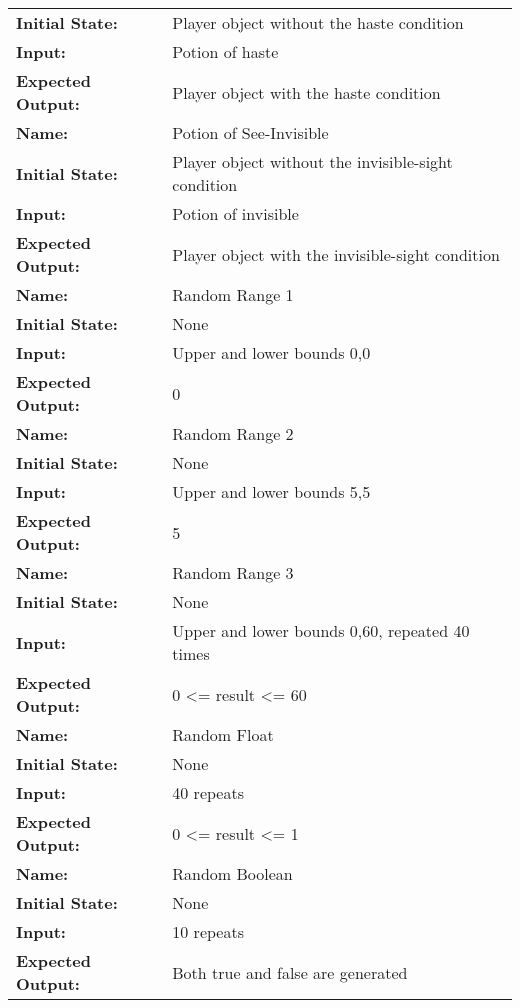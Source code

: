 \documentclass[12pt, titlepage]{article}
\begin{document}
\begin{center}
\begin{longtable}{ l | p{10cm} }
				\textbf{Initial State:} & Player object without the haste condition\\
				\textbf{Input:} & Potion of haste\\
				\textbf{Expected Output:} & Player object with the haste condition\\[0.6em]
				\hline
				\rule{0pt}{1.5em}\textbf{Name:} & Potion of See-Invisible\\
				\textbf{Initial State:} & Player object without the invisible-sight condition\\
				\textbf{Input:} & Potion of invisible\\
				\textbf{Expected Output:} & Player object with the invisible-sight condition\\[0.6em]
				\hline
				\rule{0pt}{1.5em}\textbf{Name:} & Random Range 1\\
				\textbf{Initial State:} & None\\
				\textbf{Input:} & Upper and lower bounds 0,0\\
				\textbf{Expected Output:} & 0\\[0.6em]
				\hline
				\rule{0pt}{1.5em}\textbf{Name:} & Random Range 2\\
				\textbf{Initial State:} & None\\
				\textbf{Input:} & Upper and lower bounds 5,5\\
				\textbf{Expected Output:} & 5\\[0.6em]
				\hline
				\rule{0pt}{1.5em}\textbf{Name:} & Random Range 3\\
				\textbf{Initial State:} & None\\
				\textbf{Input:} & Upper and lower bounds 0,60, repeated 40 times\\
				\textbf{Expected Output:} & 0 <= result <= 60\\[0.6em]
				\hline
				\rule{0pt}{1.5em}\textbf{Name:} & Random Float\\
				\textbf{Initial State:} & None\\
				\textbf{Input:} & 40 repeats\\
				\textbf{Expected Output:} & 0 <= result <= 1\\[0.6em]
				\hline
				\rule{0pt}{1.5em}\textbf{Name:} & Random Boolean\\
				\textbf{Initial State:} & None\\
				\textbf{Input:} & 10 repeats\\
				\textbf{Expected Output:} & Both true and false are generated\\[0.6em]

\end{longtable}
\end{center}
\end{document}
